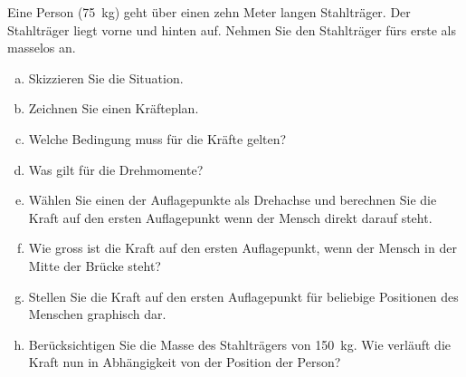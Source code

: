 
\begin{aufgabe}
	Eine Person (\SI{75}{kg}) geht über einen zehn Meter langen Stahlträger. Der Stahlträger liegt vorne und hinten auf.
 Nehmen Sie den Stahlträger fürs erste als masselos an.
\begin{enumerate} [a)]
\item Skizzieren Sie die Situation.
\item Zeichnen Sie einen Kräfteplan.
\item Welche Bedingung muss für die Kräfte gelten?
\item Was gilt für die Drehmomente?
\item Wählen Sie einen der Auflagepunkte als Drehachse und berechnen Sie die Kraft auf den ersten Auflagepunkt wenn der Mensch direkt darauf steht.
\item Wie gross ist die Kraft auf den ersten Auflagepunkt, wenn der Mensch in der Mitte der Brücke steht?
\item Stellen Sie die Kraft auf den ersten Auflagepunkt für beliebige Positionen des Menschen graphisch dar.
	\item Berücksichtigen Sie die Masse des Stahlträgers von \SI{150}{kg}. Wie verläuft die Kraft nun in Abhängigkeit von der Position der Person?
\end{enumerate}
\end{aufgabe}

